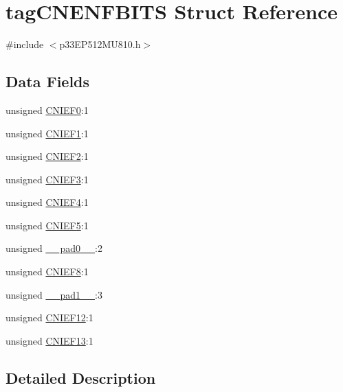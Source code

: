 \hypertarget{structtag_c_n_e_n_f_b_i_t_s}{}\section{tag\+C\+N\+E\+N\+F\+B\+I\+TS Struct Reference}
\label{structtag_c_n_e_n_f_b_i_t_s}


{\ttfamily \#include $<$p33\+E\+P512\+M\+U810.\+h$>$}

\subsection*{Data Fields}
\begin{DoxyCompactItemize}
\item 
unsigned \hyperlink{structtag_c_n_e_n_f_b_i_t_s_ab4299f3be027a9b588db995463574cd1}{C\+N\+I\+E\+F0}\+:1
\item 
unsigned \hyperlink{structtag_c_n_e_n_f_b_i_t_s_abd669d2fab1026950a2a7fca0c0decc3}{C\+N\+I\+E\+F1}\+:1
\item 
unsigned \hyperlink{structtag_c_n_e_n_f_b_i_t_s_a63cd707c6b619642e30898ce9e1cb4e7}{C\+N\+I\+E\+F2}\+:1
\item 
unsigned \hyperlink{structtag_c_n_e_n_f_b_i_t_s_a2a0bda6b13a3db1e4323bb20f5267704}{C\+N\+I\+E\+F3}\+:1
\item 
unsigned \hyperlink{structtag_c_n_e_n_f_b_i_t_s_aacae80bf98c939a7130ad201bb13b713}{C\+N\+I\+E\+F4}\+:1
\item 
unsigned \hyperlink{structtag_c_n_e_n_f_b_i_t_s_a6679536922e4798880dad9d0376c678c}{C\+N\+I\+E\+F5}\+:1
\item 
unsigned \hyperlink{structtag_c_n_e_n_f_b_i_t_s_adf71f3d8410c1f1dbbc96680a92c49af}{\+\_\+\+\_\+pad0\+\_\+\+\_\+}\+:2
\item 
unsigned \hyperlink{structtag_c_n_e_n_f_b_i_t_s_a500a06db9b7cdc49786b1a51551b291d}{C\+N\+I\+E\+F8}\+:1
\item 
unsigned \hyperlink{structtag_c_n_e_n_f_b_i_t_s_acaf2d0924a107ec6e8d2e31febaf66f9}{\+\_\+\+\_\+pad1\+\_\+\+\_\+}\+:3
\item 
unsigned \hyperlink{structtag_c_n_e_n_f_b_i_t_s_a61cac2a7bb19169917b40c13bce8427f}{C\+N\+I\+E\+F12}\+:1
\item 
unsigned \hyperlink{structtag_c_n_e_n_f_b_i_t_s_a2e56f1db57fdd78788976c4899ef3de9}{C\+N\+I\+E\+F13}\+:1
\end{DoxyCompactItemize}


\subsection{Detailed Description}


